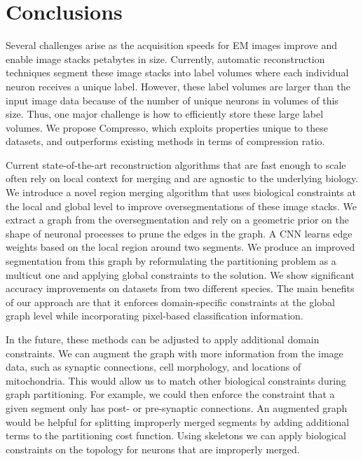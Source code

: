\section{Conclusions}

Several challenges arise as the acquisition speeds for EM images improve and enable image stacks petabytes in size.
Currently, automatic reconstruction techniques segment these image stacks into label volumes where each individual neuron receives a unique label.
However, these label volumes are larger than the input image data because of the number of unique neurons in volumes of this size.
Thus, one major challenge is how to efficiently store these large label volumes.
We propose Compresso, which exploits properties unique to these datasets, and outperforms existing methods in terms of compression ratio.

Current state-of-the-art reconstruction algorithms that are fast enough to scale often rely on local context for merging and are agnostic to the underlying biology.
We introduce a novel region merging algorithm that uses biological constraints at the local and global level to improve oversegmentations of these image stacks.
We extract a graph from the oversegmentation and rely on a geometric prior on the shape of neuronal processes to prune the edges in the graph.
A CNN learns edge weights based on the local region around two segments.
We produce an improved segmentation from this graph by reformulating the partitioning problem as a multicut one and applying global constraints to the solution.
We show significant accuracy improvements on datasets from two different species. 
The main benefits of our approach are that it enforces domain-specific constraints at the global graph level while incorporating pixel-based classification information.

In the future, these methods can be adjusted to apply additional domain constraints. 
We can augment the graph with more information from the image data, such as synaptic connections, cell morphology, and locations of mitochondria. 
This would allow us to match other biological constraints during graph partitioning. 
For example, we could then enforce the constraint that a given segment only has post- or pre-synaptic connections. 
An augmented graph would be helpful for splitting improperly merged segments by adding additional terms to the partitioning cost function. 
Using skeletons we can apply biological constraints on the topology for neurons that are improperly merged.

